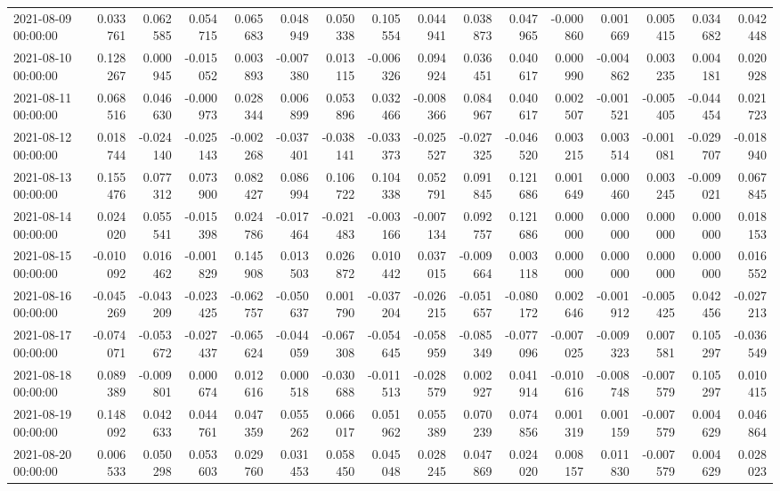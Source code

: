 \begin{tabular}{lrrrrrrrrrrrrrrr}
2021-08-09 00:00:00 & 0.033761 & 0.062585 & 0.054715 & 0.065683 & 0.048949 & 0.050338 & 0.105554 & 0.044941 & 0.038873 & 0.047965 & -0.000860 & 0.001669 & 0.005415 & 0.034682 & 0.042448 \\
2021-08-10 00:00:00 & 0.128267 & 0.000945 & -0.015052 & 0.003893 & -0.007380 & 0.013115 & -0.006326 & 0.094924 & 0.036451 & 0.040617 & 0.000990 & -0.004862 & 0.003235 & 0.004181 & 0.020928 \\
2021-08-11 00:00:00 & 0.068516 & 0.046630 & -0.000973 & 0.028344 & 0.006899 & 0.053896 & 0.032466 & -0.008366 & 0.084967 & 0.040617 & 0.002507 & -0.001521 & -0.005405 & -0.044454 & 0.021723 \\
2021-08-12 00:00:00 & 0.018744 & -0.024140 & -0.025143 & -0.002268 & -0.037401 & -0.038141 & -0.033373 & -0.025527 & -0.027325 & -0.046520 & 0.003215 & 0.003514 & -0.001081 & -0.029707 & -0.018940 \\
2021-08-13 00:00:00 & 0.155476 & 0.077312 & 0.073900 & 0.082427 & 0.086994 & 0.106722 & 0.104338 & 0.052791 & 0.091845 & 0.121686 & 0.001649 & 0.000460 & 0.003245 & -0.009021 & 0.067845 \\
2021-08-14 00:00:00 & 0.024020 & 0.055541 & -0.015398 & 0.024786 & -0.017464 & -0.021483 & -0.003166 & -0.007134 & 0.092757 & 0.121686 & 0.000000 & 0.000000 & 0.000000 & 0.000000 & 0.018153 \\
2021-08-15 00:00:00 & -0.010092 & 0.016462 & -0.001829 & 0.145908 & 0.013503 & 0.026872 & 0.010442 & 0.037015 & -0.009664 & 0.003118 & 0.000000 & 0.000000 & 0.000000 & 0.000000 & 0.016552 \\
2021-08-16 00:00:00 & -0.045269 & -0.043209 & -0.023425 & -0.062757 & -0.050637 & 0.001790 & -0.037204 & -0.026215 & -0.051657 & -0.080172 & 0.002646 & -0.001912 & -0.005425 & 0.042456 & -0.027213 \\
2021-08-17 00:00:00 & -0.074071 & -0.053672 & -0.027437 & -0.065624 & -0.044059 & -0.067308 & -0.054645 & -0.058959 & -0.085349 & -0.077096 & -0.007025 & -0.009323 & 0.007581 & 0.105297 & -0.036549 \\
2021-08-18 00:00:00 & 0.089389 & -0.009801 & 0.000674 & 0.012616 & 0.000518 & -0.030688 & -0.011513 & -0.028579 & 0.002927 & 0.041914 & -0.010616 & -0.008748 & -0.007579 & 0.105297 & 0.010415 \\
2021-08-19 00:00:00 & 0.148092 & 0.042633 & 0.044761 & 0.047359 & 0.055262 & 0.066017 & 0.051962 & 0.055389 & 0.070239 & 0.074856 & 0.001319 & 0.001159 & -0.007579 & 0.004629 & 0.046864 \\
2021-08-20 00:00:00 & 0.006533 & 0.050298 & 0.053603 & 0.029760 & 0.031453 & 0.058450 & 0.045048 & 0.028245 & 0.047869 & 0.024020 & 0.008157 & 0.011830 & -0.007579 & 0.004629 & 0.028023 \\

\end{tabular}
